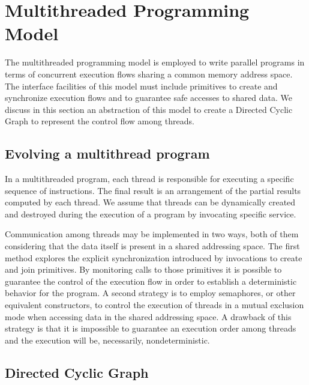 \documentclass[twocolumn]{svjour3}
\begin{document}
\section{Multithreaded Programming Model}\label{sec:proginter}

The multithreaded programming model is employed to write parallel programs in terms of concurrent execution flows sharing a common memory address space. The interface facilities of this {\color{blue}model} must include primitives to create and synchronize execution flows and to guarantee safe accesses to shared data. We discuss in this section an abstraction of this model to create a Directed Cyclic Graph to represent the control flow among threads.

\subsection{Evolving a multithread program}

In a multithreaded program, each thread is responsible for executing a specific sequence of instructions. The final result is an arrangement of the partial results computed by each thread. We assume that threads can be dynamically created and destroyed during the execution of a program by invocating {\color{blue}specific service}.

Communication among threads may be implemented in two ways, both of them considering that the data itself is present in a shared addressing space. The first method explores the explicit synchronization introduced by invocations to create and join primitives. By monitoring calls to those primitives it is possible to guarantee the control of the execution flow in order to establish a deterministic behavior for the program. 
A second strategy is to employ semaphores, or other equivalent constructors, to control the execution of threads in a mutual exclusion mode when accessing data in the shared addressing space. A drawback of this strategy is that it is impossible to guarantee an execution order among threads and the execution will be, necessarily, nondeterministic.

\subsection{Directed Cyclic Graph}
\end{document}
